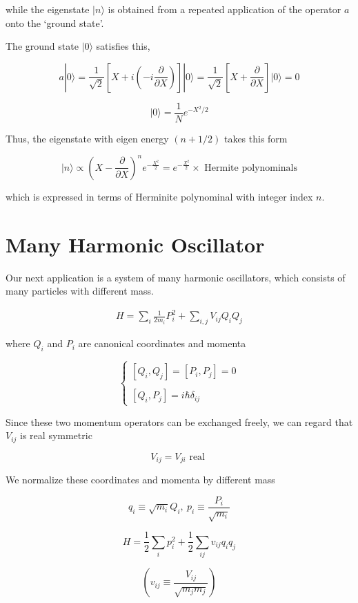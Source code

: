 while the eigenstate $|n\rangle$ is obtained from a repeated application of the operator $a$ onto the `ground state'. 

The ground state $|0\rangle$ satisfies this, 

\[a|0\rangle = \frac{1}{\sqrt{2}}\left[X+i\left(-i\frac{\partial}{\partial X}\right)\right]|0\rangle = \frac{1}{\sqrt{2}}\left[X+\frac{\partial}{\partial X}\right]|0\rangle = 0 \]

\[|0\rangle = \frac{1}{N}e^{-X^2/2} \]

Thus, the eigenstate with eigen energy $(n+1/2)$ takes this form

\[|n\rangle \propto \left(X-\frac{\partial}{\partial X}\right)^n e^{-\frac{X^2}{2}} = e^{-\frac{X^2}{2}}\times\text{ Hermite polynominals} \]

which is expressed in terms of Herminite polynominal with integer index $n$. 




\section{Many Harmonic Oscillator}

Our next application is a system of many harmonic oscillators, which consists of many particles with different mass. 

\begin{align}
H = \sum_i \frac{1}{2m_i}P_i^2+\sum_{i,j}V_{ij}Q_iQ_j
\end{align}

where $Q_i$ and $P_i$ are canonical coordinates and momenta

\[\begin{cases}
[Q_i,Q_j] = [P_i,P_j] = 0\\
\ \\
[Q_i,P_j] = i\hbar\delta_{ij}
\end{cases}\]

Since these two momentum operators can be exchanged freely, we can regard that $V_{ij}$ is real symmetric

\[V_{ij} = V_{ji}\text{ real } \]

We normalize these coordinates and momenta by different mass

\[q_i \equiv\sqrt{m_i}Q_i,\ p_i \equiv \frac{P_i}{\sqrt{m_i}} \]

\[H = \frac{1}{2}\sum_{i}p_i^2+\frac{1}{2}\sum_{ij}v_{ij}q_iq_j \]

\[(v_{ij} \equiv \frac{V_{ij}}{\sqrt{m_jm_j}} )\]

